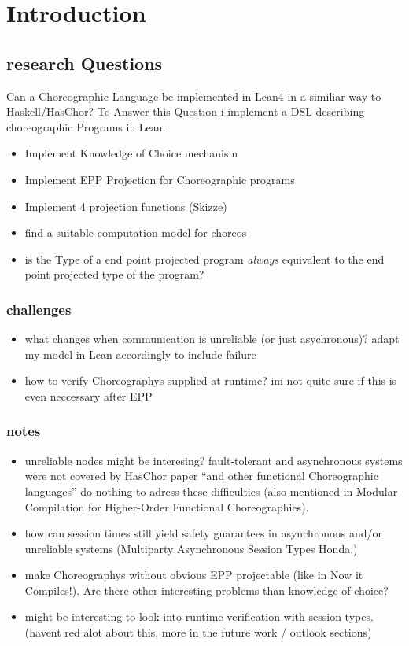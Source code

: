 \chapter{Introduction}
\label{ch:introduction}
\section{research Questions}

Can a Choreographic Language be implemented in Lean4 in a similiar way to Haskell/HasChor? To Answer this Question i implement a DSL describing choreographic Programs in Lean.
\begin{itemize}
  \item Implement Knowledge of Choice mechanism
  \item Implement EPP Projection for Choreographic programs
  \item Implement 4 projection functions (Skizze)
  \item find a suitable computation model for choreos
  \item is the Type of a end point projected program \emph{always} equivalent to the end point projected type of the program?
\end{itemize}


\subsection{challenges}
\begin{itemize}
  \item what changes when communication is unreliable (or just asychronous)? adapt my model in Lean accordingly to include failure
  \item how to verify Choreographys supplied at runtime? im not quite sure if this is even neccessary after EPP
\end{itemize}
\subsection{notes}
\begin{itemize}
  \item unreliable nodes might be interesing? fault-tolerant and asynchronous systems were not covered by HasChor paper ``and other functional Choreographic languages'' do nothing to adress these difficulties (also mentioned in Modular Compilation for Higher-Order Functional Choreographies).
  \item how can session times still yield safety guarantees in asynchronous and/or unreliable systems (Multiparty Asynchronous Session Types Honda.)
  \item make Choreographys without obvious EPP projectable (like in Now it Compiles!). Are there other interesting problems than knowledge of choice?
  \item might be interesting to look into runtime verification with session types. (havent red alot about this, more in the future work / outlook sections)
\end{itemize}
